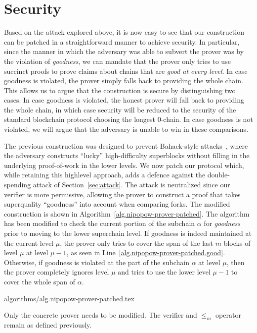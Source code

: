 \section{Security}
\label{sec:security}

Based on the attack explored above, it is now easy to see that our construction
can be patched in a straightforward manner to achieve security. In particular,
since the manner in which the adversary was able to subvert the prover was by
the violation of \emph{goodness}, we can mandate that the prover only tries to
use succinct proofs to prove claims about chains that are
\emph{good at every level}. In case goodness is violated, the prover simply
falls back to providing the whole chain. This allows us to argue that the
construction is secure by distinguishing two cases. In case goodness is
violated, the honest prover will fall back to providing the whole chain, in
which case security will be reduced to the security of the standard
blockchain protocol choosing the longest $0$-chain. In case goodness is not
violated, we will argue that the adversary is unable to win in these
comparisons.

The previous construction was designed to prevent Bahack-style
attacks~\cite{bahack}, where the adversary constructs ``lucky'' high-difficulty
superblocks without filling in the underlying proof-of-work in the lower levels.
We now patch our protocol which, while retaining this highlevel approach, adds a
defence against the double-spending attack of Section~\ref{sec:attack}. The
attack is neutralized since our verifier is more permissive, allowing the prover
to construct a proof that takes superquality ``goodness'' into account when
comparing forks. The modified construction is shown in
Algorithm~\ref{alg.nipopow-prover-patched}. The algorithm has been modified to
check the current portion of the subchain $\alpha$ for \emph{goodness} prior to
moving to the lower superchain level. If goodness is indeed maintained at the
current level $\mu$, the prover only tries to cover the span of the last $m$
blocks of level $\mu$ at level $\mu - 1$, as seen in
Line~\ref{alg.nipopow-prover-patched.good}. Otherwise, if goodness is violated
at the part of the subchain $\alpha$ at level $\mu$, then the prover completely
ignores level $\mu$ and tries to use the lower level $\mu - 1$ to cover the
whole span of $\alpha$.

{algorithms/alg.nipopow-prover-patched.tex}

Only the concrete prover needs to be modified. The verifier and $\leq_m$
operator remain as defined previously.

